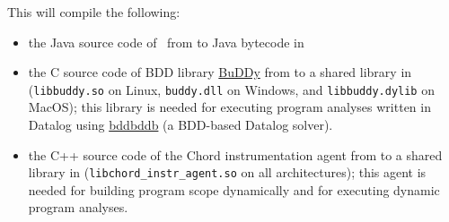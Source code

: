 This will compile the following:
\begin{itemize}
\item
the Java source code of \Chord\ from  to Java bytecode in 
\item
the C source code of BDD library \href{http://buddy.sourceforge.net/}{BuDDy} from 
to a shared library in  (\verb+libbuddy.so+ on Linux, \verb+buddy.dll+ on Windows, and
\verb+libbuddy.dylib+ on MacOS);
this library is needed for executing program analyses written in Datalog using
\href{http://bddbddb.sourceforge.net/}{bddbddb} (a BDD-based Datalog solver).
\item
the C++ source code of the Chord instrumentation agent from  to a shared
library in  (\verb+libchord_instr_agent.so+ on all architectures);
this agent is needed for building program scope dynamically
and for executing dynamic program analyses.
\end{itemize}

